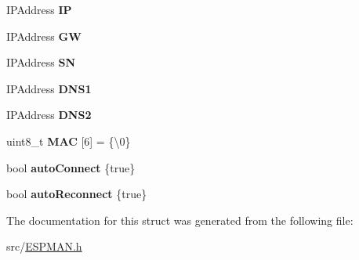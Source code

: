 \begin{DoxyCompactItemize}
I\+P\+Address {\bfseries IP}
\item 
\mbox{\label{struct_e_s_p_m_a_n_1_1settings__t_1_1_s_t_a__t_a47d32faabfad4f78e936d66ada8f87a6}} 
I\+P\+Address {\bfseries GW}
\item 
\mbox{\label{struct_e_s_p_m_a_n_1_1settings__t_1_1_s_t_a__t_a1f5941fa03fd982bb3c6b6e3e49d422d}} 
I\+P\+Address {\bfseries SN}
\item 
\mbox{\label{struct_e_s_p_m_a_n_1_1settings__t_1_1_s_t_a__t_a47c05877fc45751b9e2862ff1e604339}} 
I\+P\+Address {\bfseries D\+N\+S1}
\item 
\mbox{\label{struct_e_s_p_m_a_n_1_1settings__t_1_1_s_t_a__t_a777b5f40f4cd81c6eb34f95f1371e559}} 
I\+P\+Address {\bfseries D\+N\+S2}
\item 
\mbox{\label{struct_e_s_p_m_a_n_1_1settings__t_1_1_s_t_a__t_a05c5a7392a52acdb595d1dfb1513ff7e}} 
uint8\+\_\+t {\bfseries M\+AC} \mbox{[}6\mbox{]} = \{\textquotesingle{}\textbackslash{}0\textquotesingle{}\}
\item 
\mbox{\label{struct_e_s_p_m_a_n_1_1settings__t_1_1_s_t_a__t_aef7cd00725794bf8466c26b0904fabe8}} 
bool {\bfseries auto\+Connect} \{true\}
\item 
\mbox{\label{struct_e_s_p_m_a_n_1_1settings__t_1_1_s_t_a__t_a1b888df40cfad8366bb19723a5808f55}} 
bool {\bfseries auto\+Reconnect} \{true\}
\end{DoxyCompactItemize}


The documentation for this struct was generated from the following file\+:\begin{DoxyCompactItemize}
\item 
src/\hyperlink{_e_s_p_m_a_n_8h}{E\+S\+P\+M\+A\+N.\+h}\end{DoxyCompactItemize}
